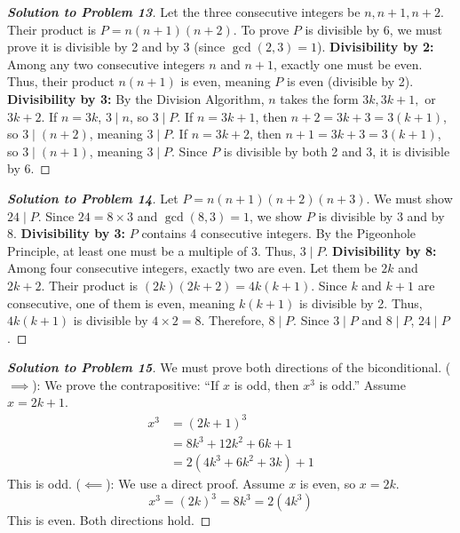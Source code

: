 \documentclass[11pt]{article}
\begin{document}
\begin{proof}[\textbf{Solution to Problem 13}]
Let the three consecutive integers be $n, n+1, n+2$. Their product is $P = n(n+1)(n+2)$.
To prove $P$ is divisible by 6, we must prove it is divisible by 2 and by 3 (since $\gcd(2,3)=1$).
\textbf{Divisibility by 2:} Among any two consecutive integers $n$ and $n+1$, exactly one must be even. Thus, their product $n(n+1)$ is even, meaning $P$ is even (divisible by 2).
\textbf{Divisibility by 3:} By the Division Algorithm, $n$ takes the form $3k, 3k+1,$ or $3k+2$.
If $n = 3k$, $3 \mid n$, so $3 \mid P$.
If $n = 3k+1$, then $n+2 = 3k+3 = 3(k+1)$, so $3 \mid (n+2)$, meaning $3 \mid P$.
If $n = 3k+2$, then $n+1 = 3k+3 = 3(k+1)$, so $3 \mid (n+1)$, meaning $3 \mid P$.
Since $P$ is divisible by both 2 and 3, it is divisible by 6.
\end{proof}

\begin{proof}[\textbf{Solution to Problem 14}]
Let $P = n(n+1)(n+2)(n+3)$. We must show $24 \mid P$. Since $24 = 8 \times 3$ and $\gcd(8,3)=1$, we show $P$ is divisible by 3 and by 8.
\textbf{Divisibility by 3:} $P$ contains 4 consecutive integers. By the Pigeonhole Principle, at least one must be a multiple of 3. Thus, $3 \mid P$.
\textbf{Divisibility by 8:} Among four consecutive integers, exactly two are even. Let them be $2k$ and $2k+2$. Their product is $(2k)(2k+2) = 4k(k+1)$. Since $k$ and $k+1$ are consecutive, one of them is even, meaning $k(k+1)$ is divisible by 2. Thus, $4k(k+1)$ is divisible by $4 \times 2 = 8$. Therefore, $8 \mid P$.
Since $3 \mid P$ and $8 \mid P$, $24 \mid P$.
\end{proof}

\begin{proof}[\textbf{Solution to Problem 15}]
We must prove both directions of the biconditional.
($\implies$): We prove the contrapositive: ``If $x$ is odd, then $x^3$ is odd.''
Assume $x = 2k + 1$.
\begin{align*}
x^3 &= (2k + 1)^3 \\
&= 8k^3 + 12k^2 + 6k + 1 \\
&= 2(4k^3 + 6k^2 + 3k) + 1
\end{align*}
This is odd.
($\impliedby$): We use a direct proof. Assume $x$ is even, so $x = 2k$.
\[ x^3 = (2k)^3 = 8k^3 = 2(4k^3) \]
This is even. Both directions hold.
\end{proof}
\end{document}
